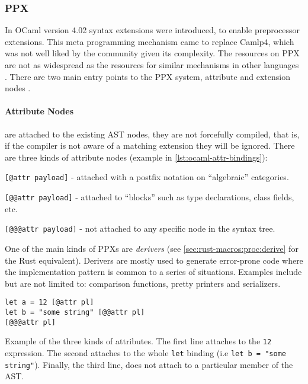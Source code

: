 \subsubsection*{PPX}\label{sec:lang-preprocessors:ocaml:ppx}

In OCaml version 4.02 syntax extensions were introduced, to enable preprocessor extensions.
This meta programming mechanism came to replace \gls{Camlp4}, which was not well liked by the community given its complexity.
The resources on \gls{PPX} are not as widespread as the resources for similar mechanisms in other languages .
There are two main entry points to the \gls{PPX} system, attribute and extension nodes \autocite[Sections 8.12 \& 8.13]{Leroy2020}.

\paragraph{Attribute Nodes} are attached to the existing AST nodes,
they are not forcefully compiled, that is, if the compiler is not aware of a matching extension they will be ignored.
There are three kinds of attribute nodes (example in \autoref{lst:ocaml-attr-bindings}):
\begin{displayquote}
	\begin{compactitem}
		\item \texttt{[@attr payload]} - attached with a postfix notation on “algebraic” categories.
		\item \texttt{[@@attr payload]} - attached to “blocks” such as type declarations, class fields, etc.
		\item \texttt{[@@@attr payload]} - not attached to any specific node in the syntax tree.
	\end{compactitem}
\end{displayquote}

One of the main kinds of \gls{PPX}s are \emph{derivers} (see \autoref{sec:rust-macros:proc:derive} for the Rust equivalent).
Derivers are mostly used to generate error-prone code where the implementation pattern is common to a series of situations.
Examples include but are not limited to: comparison functions, pretty printers and serializers\footnotemark.

% 
\begin{listing}
	\begin{verbatim}
let a = 12 [@attr pl]
let b = "some string" [@@attr pl]
[@@@attr pl]
    \end{verbatim}
	\caption[Example of the three kinds of attributes.]{
		Example of the three kinds of attributes\footnotemark[\value{footnote}].
		The first line attaches to the \texttt{12} expression.
		The second attaches to the whole \texttt{let} binding (i.e \texttt{let b = "some string"}).
		Finally, the third line, does not attach to a particular member of the AST.
	}
	\label{lst:ocaml-attr-bindings}
\end{listing}


